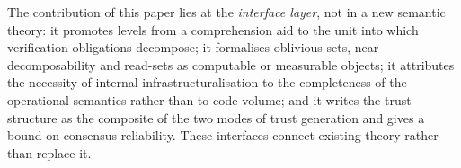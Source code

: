 \begin{principle}\label{pr:self-position}
The contribution of this paper lies at the \emph{interface layer}, not in a new semantic
theory: it promotes levels from a comprehension aid to the unit into which verification
obligations decompose; it formalises oblivious sets, near-decomposability and read-sets as
computable or measurable objects; it attributes the necessity of internal
infrastructuralisation to the completeness of the operational semantics rather than to code
volume; and it writes the trust structure as the composite of the two modes of trust
generation and gives a bound on consensus reliability. These interfaces connect existing
theory rather than replace it.
\end{principle}
